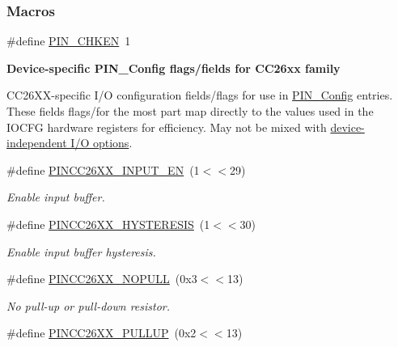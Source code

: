\subsubsection*{Macros}
\begin{DoxyCompactItemize}
\item 
\#define \hyperlink{_p_i_n_c_c26_x_x_8h_a62bc64a4f307af84ae177c2675de76a1}{P\-I\-N\-\_\-\-C\-H\-K\-E\-N}~1
\end{DoxyCompactItemize}
\begin{Indent}{\bf Device-\/specific P\-I\-N\-\_\-\-Config flags/fields for C\-C26xx family}\par
{\em \label{_p_i_n_c_c26_x_x_8h_PINCC26XX_FLAGS}%
\hypertarget{_p_i_n_c_c26_x_x_8h_PINCC26XX_FLAGS}{}%


C\-C26\-X\-X-\/specific I/\-O configuration fields/flags for use in \hyperlink{_p_i_n_8h_ae427b7d2925f9b0f3145e455cfdb5841}{P\-I\-N\-\_\-\-Config} entries. These fields flags/for the most part map directly to the values used in the {\ttfamily I\-O\-C\-F\-G} hardware registers for efficiency. May not be mixed with \hyperlink{_p_i_n_8h_PIN_GENERIC_FLAGS}{device-\/independent I/\-O options}. }\begin{DoxyCompactItemize}
\item 
\#define \hyperlink{_p_i_n_c_c26_x_x_8h_adceda75e6ee6dfdae2fd7769b809fc0e}{P\-I\-N\-C\-C26\-X\-X\-\_\-\-I\-N\-P\-U\-T\-\_\-\-E\-N}~(1$<$$<$29)
\begin{DoxyCompactList}\small\item\em Enable input buffer. \end{DoxyCompactList}\item 
\#define \hyperlink{_p_i_n_c_c26_x_x_8h_a63fe5dc3570f58ba8aa123db1cee6fe7}{P\-I\-N\-C\-C26\-X\-X\-\_\-\-H\-Y\-S\-T\-E\-R\-E\-S\-I\-S}~(1$<$$<$30)
\begin{DoxyCompactList}\small\item\em Enable input buffer hysteresis. \end{DoxyCompactList}\item 
\#define \hyperlink{_p_i_n_c_c26_x_x_8h_a8e3b3ef05fc9e291a6d9ad9971b8142c}{P\-I\-N\-C\-C26\-X\-X\-\_\-\-N\-O\-P\-U\-L\-L}~(0x3$<$$<$13)
\begin{DoxyCompactList}\small\item\em No pull-\/up or pull-\/down resistor. \end{DoxyCompactList}\item 
\#define \hyperlink{_p_i_n_c_c26_x_x_8h_a25291b96b05bfa0e4ff6365da4cbf221}{P\-I\-N\-C\-C26\-X\-X\-\_\-\-P\-U\-L\-L\-U\-P}~(0x2$<$$<$13)

\end{DoxyCompactItemize}
\end{Indent}
